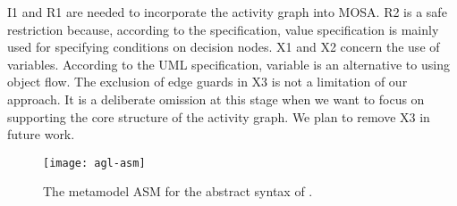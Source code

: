 I1 and R1 are needed to incorporate the activity graph into MOSA. R2 is a safe restriction because, according to the specification, value specification is mainly used for specifying conditions on decision nodes. X1 and X2 concern the use of variables. According to the UML specification, variable is an alternative to using object flow. The exclusion of edge guards in X3 is not a limitation of our approach. It is a deliberate omission at this stage when we want to focus on supporting the core structure of the activity graph. We plan to remove X3 in future work.
%
%
\begin{figure*}[ht]
	\begin{center}
		\texttt{[image: agl-asm]}
	\end{center}
	\caption{The metamodel ASM for the abstract syntax of \agl.} %
	\label{fig:agl-abstractSyntax}
\end{figure*}


